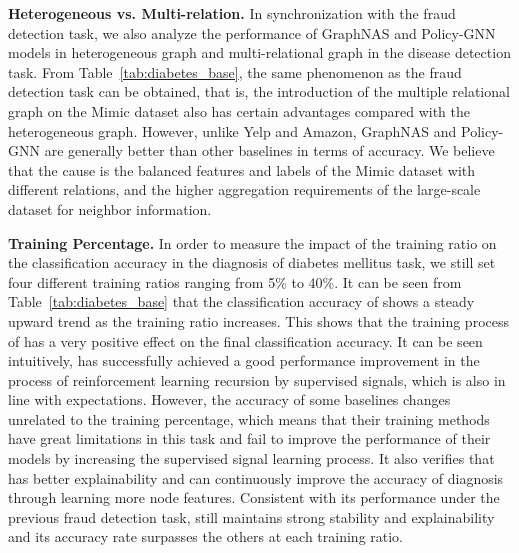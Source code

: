 \textbf{Heterogeneous vs. Multi-relation. }
In synchronization with the fraud detection task, we also analyze the performance of GraphNAS and Policy-GNN models in heterogeneous graph and multi-relational graph in the disease detection task. 
From Table~\ref{tab:diabetes_base}, the same phenomenon as the fraud detection task can be obtained, that is, the introduction of the multiple relational graph on the Mimic dataset also has certain advantages compared with the heterogeneous graph. 
However, unlike Yelp and Amazon, GraphNAS and Policy-GNN are generally better than other baselines in terms of accuracy. 
We believe that the cause is the balanced features and labels of the Mimic dataset with different relations, and the higher aggregation requirements of the large-scale dataset for neighbor information.



\textbf{Training Percentage.}
In order to measure the impact of the training ratio on the classification accuracy in the diagnosis of diabetes mellitus task, we still set four different training ratios ranging from 5\% to 40\%. 
It can be seen from Table~\ref{tab:diabetes_base} that the classification accuracy of \RioGNN shows a steady upward trend as the training ratio increases. 
This shows that the training process of \RioGNN has a very positive effect on the final classification accuracy. 
It can be seen intuitively, \RioGNN has successfully achieved a good performance improvement in the process of reinforcement learning recursion by supervised signals, which is also in line with expectations. 
However, the accuracy of some baselines changes unrelated to the training percentage, which means that their training methods have great limitations in this task and fail to improve the performance of their models by increasing the supervised signal learning process. 
It also verifies that \RioGNN has better explainability and can continuously improve the accuracy of diagnosis through learning more node features. 
Consistent with its performance under the previous fraud detection task, \RioGNN still maintains strong stability and explainability and its accuracy rate surpasses the others at each training ratio. 




